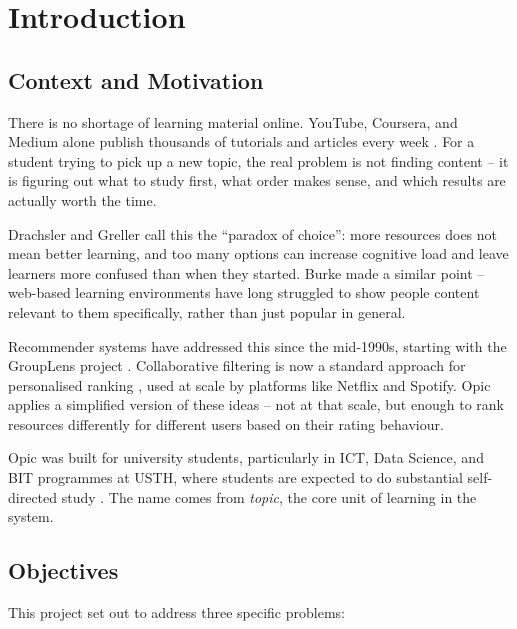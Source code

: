 \documentclass[12pt,a4paper]{report}
\begin{document}
\newpage

\chapter{Introduction}

\section{Context and Motivation}

There is no shortage of learning material online. YouTube, Coursera, and Medium alone publish thousands of tutorials and articles every week \cite{coursera2023}. For a student trying to pick up a new topic, the real problem is not finding content -- it is figuring out what to study first, what order makes sense, and which results are actually worth the time.

Drachsler and Greller \cite{drachsler2016} call this the ``paradox of choice'': more resources does not mean better learning, and too many options can increase cognitive load and leave learners more confused than when they started. Burke \cite{burke2002} made a similar point -- web-based learning environments have long struggled to show people content relevant to them specifically, rather than just popular in general.

Recommender systems have addressed this since the mid-1990s, starting with the GroupLens project \cite{resnick1994}. Collaborative filtering is now a standard approach for personalised ranking \cite{koren2009}, used at scale by platforms like Netflix and Spotify. Opic applies a simplified version of these ideas -- not at that scale, but enough to rank resources differently for different users based on their rating behaviour.

Opic was built for university students, particularly in ICT, Data Science, and BIT programmes at USTH, where students are expected to do substantial self-directed study \cite{zimmerman2002,brusilovsky2007}. The name comes from \textit{topic}, the core unit of learning in the system.

\section{Objectives}

This project set out to address three specific problems:
\end{document}
